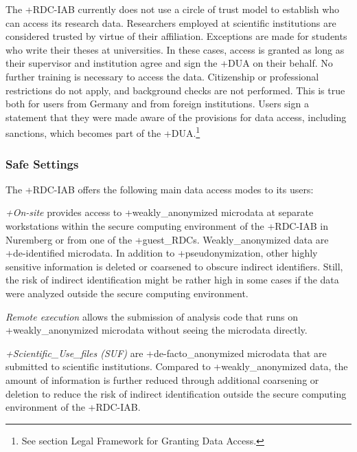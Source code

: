 \documentclass[
]{WileySix}
\begin{document}
The +RDC-IAB\textbar{} currently does not use a circle of trust model to establish who can access its research data. Researchers employed at scientific institutions are considered trusted by virtue of their affiliation. Exceptions are made for students who write their theses at universities. In these cases, access is granted as long as their supervisor and institution agree and sign the +DUA\textbar{} on their behalf. No further training is necessary to access the data. Citizenship or professional restrictions do not apply, and background checks are not performed. This is true both for users from Germany and from foreign institutions. Users sign a statement that they were made aware of the provisions for data access, including sanctions, which becomes part of the +DUA\textbar.\footnote{See section Legal Framework for Granting Data Access.}

\hypertarget{safe-settings}{%
\subsubsection{Safe Settings}\label{safe-settings}}

The +RDC-IAB\textbar{} offers the following main data access modes to its users:

\emph{+On-site\textbar{}} provides access to +weakly\_anonymized\textbar{} microdata at separate workstations within the secure computing environment of the +RDC-IAB\textbar{} in Nuremberg or from one of the +guest\_RDC\textbar s. Weakly\_anonymized data are +de-identified\textbar{} microdata. In addition to +pseudonymization\textbar, other highly sensitive information is deleted or coarsened to obscure indirect identifiers. Still, the risk of indirect identification might be rather high in some cases if the data were analyzed outside the secure computing environment.

\emph{Remote execution} allows the submission of analysis code that runs on +weakly\_anonymized\textbar{} microdata without seeing the microdata directly.

\emph{+Scientific\_Use\_files\textbar{} (SUF)} are +de-facto\_anonymized\textbar{} microdata that are submitted to scientific institutions. Compared to +weakly\_anonymized\textbar{} data, the amount of information is further reduced through additional coarsening or deletion to reduce the risk of indirect identification outside the secure computing environment of the +RDC-IAB\textbar.
\end{document}
